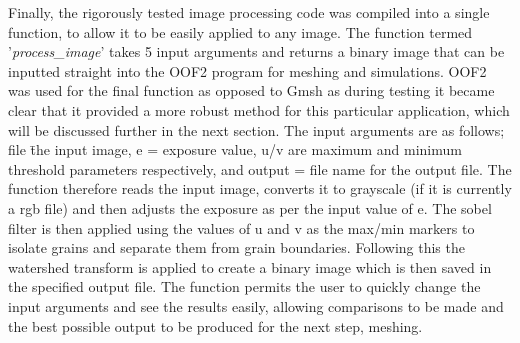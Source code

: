 \documentclass[\report.tex]{subfiles}
\begin{document}
\noindent Finally, the rigorously tested image processing code was compiled into a single function, to allow it to be easily applied to any image. The function termed '\emph{process_image}' takes 5 input arguments and returns a binary image that can be inputted straight into the OOF2 program for meshing and simulations. OOF2 was used for the final function as opposed to Gmsh as during testing it became clear that it provided a more robust method for this particular application, which will be discussed further in the next section. The input arguments are as follows; file \= the input image, e = exposure value, u/v are maximum and minimum threshold parameters respectively, and output = file name for the output file. The function therefore reads the input image, converts it to grayscale (if it is currently a rgb file) and then adjusts the exposure as per the input value of e. The sobel filter is then applied using the values of u and v as the max/min markers to isolate grains and separate them from grain boundaries. Following this the watershed transform is applied to create a binary image which is then saved in the specified output file. The function permits the user to quickly change the input arguments and see the results easily, allowing comparisons to be made and the best possible output to be produced for the next step, meshing.
\end{document}
